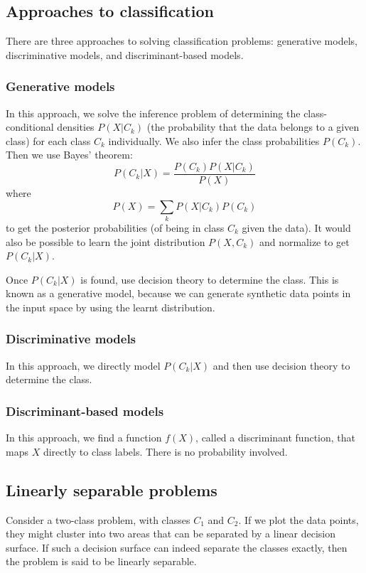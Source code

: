 \documentclass[a4paper,12pt]{article}
\begin{document}
\subsection{Approaches to classification}

There are three approaches to solving classification problems: generative models, discriminative models, and discriminant-based models. 

\subsubsection{Generative models}

In this approach, we solve the inference problem of determining the class-conditional densities $P(X|C_k)$ (the probability that the data belongs to a given class) for each class $C_k$ individually. We also infer the class probabilities $P(C_k)$. Then we use Bayes' theorem: 
$$P(C_k|X) = \frac{P(C_k)P(X|C_k)}{P(X)}$$
where 
$$P(X) = \sum_k P(X|C_k)P(C_k)$$ 
to get the posterior probabilities (of being in class $C_k$ given the data). It would also be possible to learn the joint distribution $P(X, C_k)$ and normalize to get $P(C_k|X)$. 

Once $P(C_k|X)$ is found, use decision theory to determine the class. This is known as a generative model, because we can generate synthetic data points in the input space by using the learnt distribution. 

\subsubsection{Discriminative models}

In this approach, we directly model $P(C_k|X)$ and then use decision theory to determine the class. 

\subsubsection{Discriminant-based models}

In this approach, we find a function $f(X)$, called a discriminant function, that maps $X$ directly to class labels. There is no probability involved. 

\subsection{Linearly separable problems}

Consider a two-class problem, with classes $C_1$ and $C_2$. If we plot the data points, they might cluster into two areas that can be separated by a linear decision surface. If such a decision surface can indeed separate the classes exactly, then the problem is said to be linearly separable. 
\end{document}

